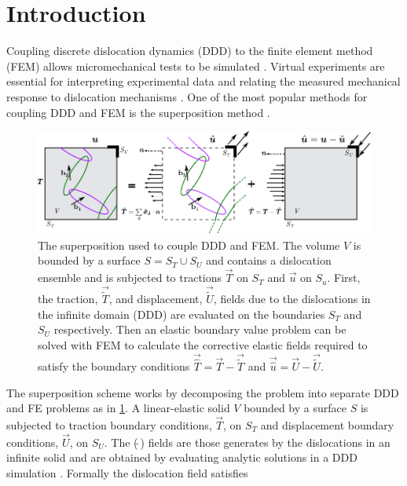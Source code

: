 \documentclass[11pt]{iopart}
\begin{document}
\section{Introduction}\label{s:intro}
Coupling discrete dislocation dynamics (DDD) to the finite element method (FEM) allows micromechanical tests to be simulated \cite{Groh2009}. Virtual experiments are essential for interpreting experimental data and relating the measured mechanical response to dislocation mechanisms \cite{0965-0393-6-6-007,doi:10.1080/14786430500341250,tarleton2015discrete,YU2018}. One of the most popular methods for coupling DDD and FEM is the superposition method \cite{superposition_scheme0,superposition_scheme1,superposition_scheme2}.
%
\begin{figure}
    \centering
    \includegraphics[width=\linewidth]{fem_ddd.pdf}
    \caption[Superposition Model for DDD-FEM coupling.]{The superposition used to couple DDD and FEM. The volume $V$ is bounded by a surface $S = S_{T} \cup S_{U}$ and contains a dislocation ensemble and is subjected to tractions $\vec{T}$ on $S_{T}$ and $\vec{u}$ on $S_{u}$. First, the traction, $\vec{\tilde{T}}$, and displacement, $\vec{\tilde{U}}$, fields due to the dislocations in the infinite domain (DDD) are evaluated on the boundaries $S_{T}$ and $S_{U}$ respectively. Then an elastic boundary value problem can be solved with FEM to calculate the corrective elastic fields required to satisfy the boundary conditions $\vec{\hat{T}} = \vec{T} - \vec{\tilde{T}}$ and $\vec{\hat{u}} = \vec{U} - \vec{\tilde{U}}$.}
    \label{f:superposition_scheme}
\end{figure}
%        
The superposition scheme works by decomposing the problem into separate DDD and FE problems as in \cref{f:superposition_scheme}. A linear-elastic solid $V$ bounded by a surface $S$ is subjected to traction boundary conditions, $\vec{T}$, on $S_{T}$ and displacement boundary conditions, $\vec{U}$, on $S_{U}$. The ($\tilde{~}$) fields are those generates by the dislocations in an infinite solid and are obtained by evaluating analytic solutions in a DDD simulation \cite{Cai2006}. Formally the dislocation field satisfies
\end{document}
